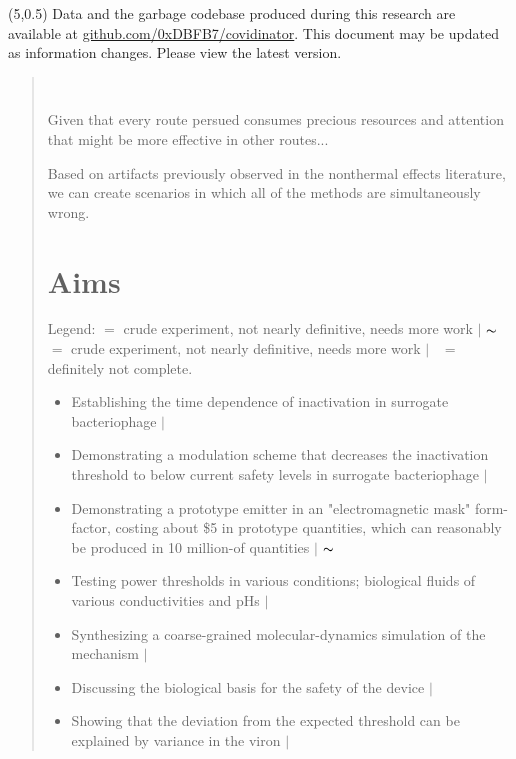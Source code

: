 \documentclass[paper.tex]{subfiles}
\begin{document}
\null\begin{tabular}[t]{l@{}}
	  \\
	
\end{tabular}


\begin{textblock*}{\textwidth}(5,0.5)
\noindent Data and the garbage codebase produced during this research are available at \href{https://www.github.com/0xDBFB7/covidinator}{github.com/0xDBFB7/covidinator}. This document may be updated as information changes. Please view the latest version. 
\end{textblock*}

\begin{quotation}\



Given that every route persued consumes precious resources and attention that might be more effective in 
other routes...



Based on artifacts previously observed in the nonthermal effects literature, we can create scenarios in which all of the methods are simultaneously wrong. 

\section{Aims}




Legend:  \cmark $ = $ crude experiment, not nearly definitive, needs more work $\vert$ $\thicksim$ $ = $ crude experiment, not nearly definitive, needs more work $\vert$ \xmark \ $ = $ definitely not complete.\\

\begin{itemize}
  \item Establishing the time dependence of inactivation in surrogate bacteriophage $\vert$ \cmark
  \item Demonstrating a modulation scheme that decreases the inactivation threshold to below current safety levels in surrogate bacteriophage $\vert$ \cmark
  \item Demonstrating a prototype emitter in an "electromagnetic mask" form-factor, costing about \$5 in prototype quantities, which can reasonably be produced in 10 million-of quantities $\vert$ $\thicksim$
  \item Testing power thresholds in various conditions; biological fluids of various conductivities and pHs $\vert$ \xmark
  \item Synthesizing a coarse-grained molecular-dynamics simulation of the mechanism $\vert$ \xmark
  \item Discussing the biological basis for the safety of the device $\vert$ \cmark
  \item Showing that the deviation from the expected threshold can be explained by variance in the viron $\vert$ \cmark
  

\end{itemize}
\end{quotation}
\end{document}
